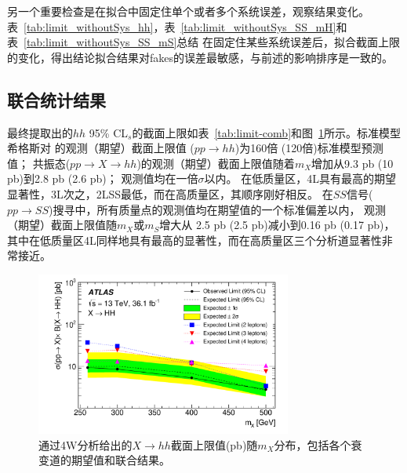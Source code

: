 另一个重要检查是在拟合中固定住单个或者多个系统误差，观察结果变化。表~\ref{tab:limit_withoutSys_hh}，表~\ref{tab:limit_withoutSys_SS_mH}和表~\ref{tab:limit_withoutSys_SS_mS}总结
在固定住某些系统误差后，拟合截面上限的变化，得出结论拟合结果对fakes的误差最敏感，与前述的影响排序是一致的。

\clearpage

\subsection{联合统计结果}
最终提取出的$hh$ 95\% CL$_s$的截面上限如表~\ref{tab:limit-comb}和图~\ref{fig:limit-comb}所示。标准模型希格斯对
的观测（期望）截面上限值 ($pp\rightarrow hh$)为160倍 (120倍)标准模型预测值；
共振态($pp\rightarrow X\rightarrow hh$)的观测（期望）截面上限值随着$m_X$增加从9.3 pb (10 pb)到2.8 pb (2.6 pb)；
观测值均在一倍$\sigma$以内。
在低质量区，4L具有最高的期望显著性，3L次之，2LSS最低，而在高质量区，其顺序刚好相反。
在$SS$信号($pp\rightarrow SS$)搜寻中，所有质量点的观测值均在期望值的一个标准偏差以内，
观测（期望）截面上限值随$m_X$或$m_S$增大从
2.5 pb  (2.5 pb)减小到0.16 pb (0.17 pb)，
其中在低质量区4L同样地具有最高的显著性，而在高质量区三个分析道显著性非常接近。
\begin{figure}[!h!tpb]
  \centering
 \includegraphics[width=0.75\textwidth]{fig/4W-Paper-36ifb_Paper_figures_limits_limit-comb-hh-AllSys.pdf}
\caption{通过4W分析给出的$X\rightarrow hh$截面上限值(pb)随$m_X$分布，包括各个衰变道的期望值和联合结果。}
 \label{fig:limit-comb}
\end{figure}
